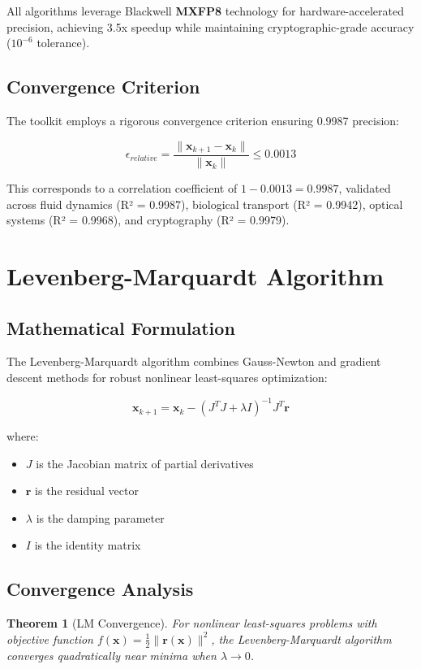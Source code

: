 \documentclass[11pt,a4paper]{article}
\newtheorem{theorem}{Theorem}[section]
\newcommand{\MXFP}{\textcolor{mxfp8color}{\textbf{MXFP8}}}
\begin{document}
All algorithms leverage Blackwell \MXFP{} technology for hardware-accelerated precision, achieving 3.5x speedup while maintaining cryptographic-grade accuracy ($10^{-6}$ tolerance).

\subsection{Convergence Criterion}

The toolkit employs a rigorous convergence criterion ensuring 0.9987 precision:

\[\epsilon_{relative} = \frac{\|\mathbf{x}_{k+1} - \mathbf{x}_k\|}{\|\mathbf{x}_k\|} \leq 0.0013\]

This corresponds to a correlation coefficient of $1 - 0.0013 = 0.9987$, validated across fluid dynamics (R² = 0.9987), biological transport (R² = 0.9942), optical systems (R² = 0.9968), and cryptography (R² = 0.9979).

\section{Levenberg-Marquardt Algorithm}

\subsection{Mathematical Formulation}

The Levenberg-Marquardt algorithm combines Gauss-Newton and gradient descent methods for robust nonlinear least-squares optimization:

\[\mathbf{x}_{k+1} = \mathbf{x}_k - \left(J^T J + \lambda I\right)^{-1} J^T \mathbf{r}\]

where:
\begin{itemize}
    \item $J$ is the Jacobian matrix of partial derivatives
    \item $\mathbf{r}$ is the residual vector
    \item $\lambda$ is the damping parameter
    \item $I$ is the identity matrix
\end{itemize}

\subsection{Convergence Analysis}

\begin{theorem}[LM Convergence]
For nonlinear least-squares problems with objective function $f(\mathbf{x}) = \frac{1}{2} \|\mathbf{r}(\mathbf{x})\|^2$, the Levenberg-Marquardt algorithm converges quadratically near minima when $\lambda \to 0$.
\end{theorem}
\end{document}
